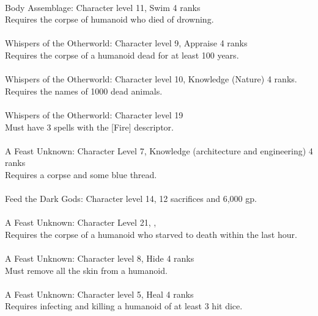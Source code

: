 \begin{multicols}{2}
\begin{small}
\\
Body Assemblage: Character level 11, Swim 4 ranks\\
Requires the corpse of humanoid who died of drowning.\\
\\
Whispers of the Otherworld: Character level 9, Appraise 4 ranks\\
Requires the corpse of a humanoid dead for at least 100 years.\\
\\
Whispers of the Otherworld: Character level 10, Knowledge (Nature) 4 ranks.\\
Requires the names of 1000 dead animals.\\
\\
Whispers of the Otherworld: Character level 19\\
Must have 3 spells with the [Fire] descriptor.\\
\\
A Feast Unknown: Character Level 7, Knowledge (architecture and engineering) 4 ranks\\
Requires a corpse and some blue thread.\\
\\
Feed the Dark Gods: Character level 14, 12 sacrifices and 6,000 gp.\\
\\
A Feast Unknown: Character Level 21, , \\
Requires the corpse of a humanoid who starved to death within the last hour.\\
\\
A Feast Unknown: Character level 8, Hide 4 ranks\\
Must remove all the skin from a humanoid.\\
\vspace{20pt}
\\
A Feast Unknown: Character level 5, Heal 4 ranks\\
Requires infecting and killing a humanoid of at least 3 hit dice.\\

\end{small}
\end{multicols}
